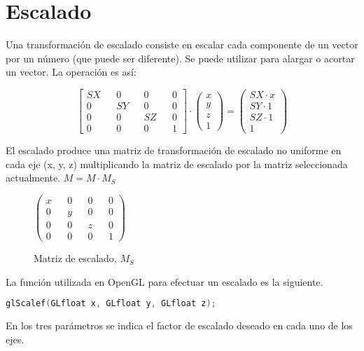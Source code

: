 \newpage
\section{Escalado}
Una transformación de escalado consiste en escalar cada componente de un vector por un número (que puede ser diferente). Se puede utilizar para alargar o acortar un vector. La operación es así:

\begin{minipage}{0.3\textwidth}
  \centering
\end{minipage}
\begin{minipage}{0.5\textwidth}
  \centering
  \[
  \begin{bmatrix}
    SX && 0 && 0 && 0\\
    0 && SY && 0 && 0\\
    0 && 0 && SZ && 0\\
    0 && 0 && 0 && 1
  \end{bmatrix}
  \cdot
  \begin{pmatrix}
    x \\ y \\ z \\ 1
  \end{pmatrix}
  =
  \begin{pmatrix}
    SX \cdot x \\
    SY \cdot 1 \\
    SZ \cdot 1 \\
    1
  \end{pmatrix}
  \]
\end{minipage}


El escalado produce una matriz de transformación de escalado no uniforme en cada eje (x, y, z) multiplicando la matriz de escalado por la matriz seleccionada actualmente. $M = M \cdot M_S$
\begin{figure} [ht]
  \centering
  \(
  \begin{pmatrix}
    x && 0 && 0 && 0\\
    0 && y && 0 && 0\\
    0 && 0 && z && 0\\
    0 && 0 && 0 && 1
  \end{pmatrix}
  \)
  \caption{Matriz de escalado, $M_S$}
\end{figure}

La función utilizada en OpenGL para efectuar un escalado es la siguiente.
\begin{lstlisting}[language=C]
  glScalef(GLfloat x, GLfloat y, GLfloat z);
\end{lstlisting}
En los tres parámetros se indica el factor de escalado deseado en cada uno de los ejes.

